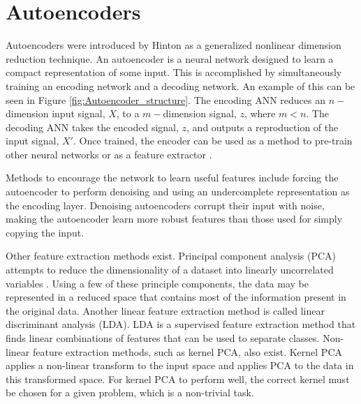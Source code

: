 \section{Autoencoders} \label{Autoencoders}

Autoencoders were introduced by Hinton \cite{Hinton2006} as a generalized nonlinear dimension reduction technique. An autoencoder is a neural network designed to learn a compact representation of some input. This is accomplished by simultaneously training an encoding network and a decoding network. An example of this can be seen in Figure \ref{fig:Autoencoder_structure}. The encoding ANN reduces an $n-$dimension input signal, $X$, to a $m-$dimension signal, $z$, where $m < n$. The decoding ANN takes the encoded signal, $z$, and outputs a reproduction of the input signal, $X'$. Once trained, the encoder can be used as a method to pre-train other neural networks or as a feature extractor \cite{CHARTE2018}. 

Methods to encourage the network to learn useful features include forcing the autoencoder to perform denoising \cite{Vincent2008, Vincent2010} and using an undercomplete representation as the encoding layer. Denoising autoencoders corrupt their input with noise, making the autoencoder learn more robust features than those used for simply copying the input. 


Other feature extraction methods exist. Principal component analysis (PCA) attempts to reduce the dimensionality of a dataset into linearly uncorrelated variables \cite{Jolliffe2002}. Using a few of these principle components, the data may be represented in a reduced space that contains most of the information present in the original data. Another linear feature extraction method is called linear discriminant analysis (LDA). LDA is a supervised feature extraction method that finds linear combinations of features that can be used to separate classes. Non-linear feature extraction methods, such as kernel PCA, also exist. Kernel PCA applies a non-linear transform to the input space and applies PCA to the data in this transformed space. For kernel PCA to perform well, the correct kernel must be chosen for a given problem, which is a non-trivial task.




